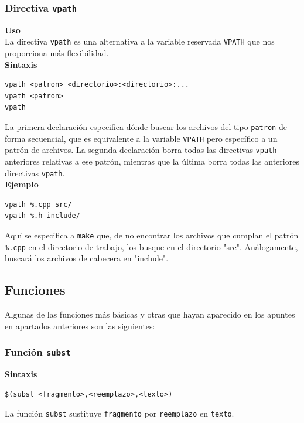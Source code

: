 \documentclass[11pt,twoside,titlepage,a4paper]{article}
\theoremstyle{definition}
\theoremstyle{plain_rojo}
\theoremstyle{remark}
\begin{document}
\subsubsection{Directiva \texttt{vpath}}

\textbf{\textcolor{burdeos}{Uso}}
\\La directiva \texttt{vpath} es una alternativa a la variable reservada 
\texttt{VPATH} que nos proporciona más flexibilidad.
\\

\textbf{\textcolor{burdeos}{Sintaxis}}
\begin{lstlisting}
vpath <patron> <directorio>:<directorio>:...
vpath <patron>
vpath
\end{lstlisting}
La primera declaración especifica dónde buscar los archivos del tipo \texttt{patron} de forma secuencial, que es equivalente a la variable 
\texttt{VPATH} pero específico a un patrón de archivos. La segunda 
declaración borra todas las directivas \texttt{vpath} anteriores relativas a 
ese patrón, mientras que la última borra todas las anteriores directivas 
\texttt{vpath}.
\\

\textbf{\textcolor{burdeos}{Ejemplo}}
\begin{lstlisting}
vpath %.cpp src/
vpath %.h include/
\end{lstlisting}
Aquí se especifica a \texttt{make} que, de no encontrar los archivos que 
cumplan el patrón \texttt{\%.cpp} en el directorio de trabajo, los busque en 
el directorio "src". Análogamente, buscará los archivos de cabecera en 
"include".

\subsection{Funciones}

Algunas de las funciones más básicas y otras que hayan aparecido en los 
apuntes en apartados anteriores son las siguientes:

\subsubsection{Función \texttt{subst}}

\textbf{\textcolor{burdeos}{Sintaxis}}
\begin{lstlisting}
$(subst <fragmento>,<reemplazo>,<texto>)
\end{lstlisting}
La función \texttt{subst} sustituye \texttt{fragmento} por \texttt{reemplazo}
en \texttt{texto}.
\\
\end{document}
